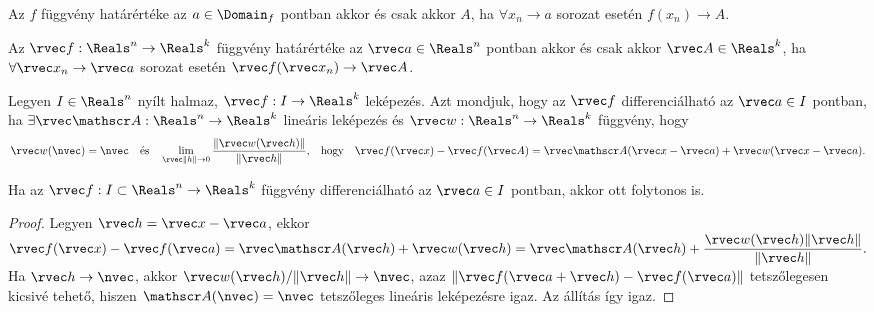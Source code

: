 \begin{theorem}
  Az $f$ függvény határértéke az $a \in \Domain_f$ pontban akkor és csak akkor
  $A$, ha $\forall x_n \to a$ sorozat esetén $f(x_n) \to A$.
\end{theorem}

\begin{theorem}
  Az $\rvec f: \Reals^n \to \Reals^k$ függvény határértéke az $\rvec a \in \Reals^n$
  pontban akkor és csak akkor $\rvec A \in \Reals^k$, ha
  $\forall \rvec x_n \to \rvec a$ sorozat esetén
  $\rvec f(\rvec x_n) \to \rvec A$.
\end{theorem}

\begin{definition}
  Legyen $I \in \Reals^n$ nyílt halmaz, $\rvec f: I \to \Reals^k$ leképezés.
  Azt mondjuk, hogy az $\rvec f$ differenciálható az $\rvec a \in I$ pontban, ha
  $\exists \rvec \mathscr A: \Reals^n \to \Reals^k$ lineáris leképezés és
  $\rvec w: \Reals^n \to \Reals^k$ függvény, hogy
  $$
    \rvec w(\nvec) = \nvec
    \quad\text{és}\quad
    \lim_{\rvec \|h\| \to 0} \frac{
      \|\rvec w(\rvec h)\|
    }{
      \|\rvec h\|
    }
    \text,\quad \text{hogy} \quad
    \rvec f(\rvec x) - \rvec f(\rvec A)
    = \rvec \mathscr A(\rvec x - \rvec a) + \rvec w(\rvec x - \rvec a)
    \text.
  $$
\end{definition}

\begin{statement}
  Ha az $\rvec f: I \subset \Reals^n \to \Reals^k$ függvény differenciálható az
  $\rvec a \in I$ pontban, akkor ott folytonos is.

  \begin{proof}
    Legyen $\rvec h = \rvec x - \rvec a$, ekkor
    $\displaystyle
      \rvec f(\rvec x) - \rvec f(\rvec a)
      = \rvec \mathscr A(\rvec h) + \rvec w(\rvec h)
      = \rvec \mathscr A(\rvec h) + \frac{\rvec w(\rvec h) \|\rvec h\|}{\|\rvec h\|}
      \text.
    $
    \\[2mm]
    Ha $\rvec h \to \nvec$, akkor $\rvec w(\rvec h) / \|\rvec h\| \to \nvec$,
    azaz $\|\rvec f(\rvec a + \rvec h) - \rvec f(\rvec a)\|$ tetszőlegesen
    kicsivé tehető, hiszen $\mathscr A(\nvec) = \nvec$ tetszőleges lineáris
    leképezésre igaz. Az állítás így igaz.
  \end{proof}
\end{statement}

